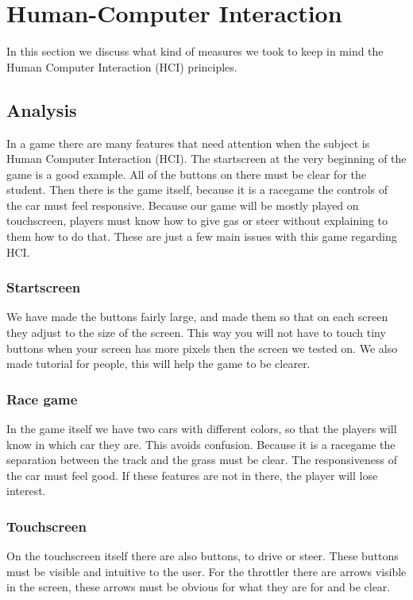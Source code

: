 \documentclass[11pt,twoside,a4paper]{article}
\begin{document}
\newpage

\section{Human-Computer Interaction}
In this section we discuss what kind of measures we took to keep in mind the Human Computer Interaction (HCI) principles.

\subsection{Analysis}
In a game there are many features that need attention when the subject is Human Computer Interaction (HCI). The startscreen at the very beginning of the game is a good example. All of the buttons on there must be clear for the student. Then there is the game itself, because it is a racegame the controls of the car must feel responsive. Because our game will be mostly played on touchscreen, players must know how to give gas or steer without explaining to them how to do that. These are just a few main issues with this game regarding HCI. 

\subsubsection{Startscreen}
We have made the buttons fairly large, and made them so that on each screen they adjust to the size of the screen. This way you will not have to touch tiny buttons when your screen has more pixels then the screen we tested on. We also made tutorial for people, this will help the game to be clearer.

\subsubsection{Race game}
In the game itself we have two cars with different colors, so that the players will know in which car they are. This avoids confusion. Because it is a racegame the separation between the track and the grass must be clear. The responsiveness of the car must feel good. If these features are not in there, the player will lose interest. 

\subsubsection{Touchscreen}
On the touchscreen itself there are also buttons, to drive or steer. These buttons must be visible and intuitive to the user. For the throttler there are arrows visible in the screen, these arrows must be obvious for what they are for and be clear. 
\end{document}
